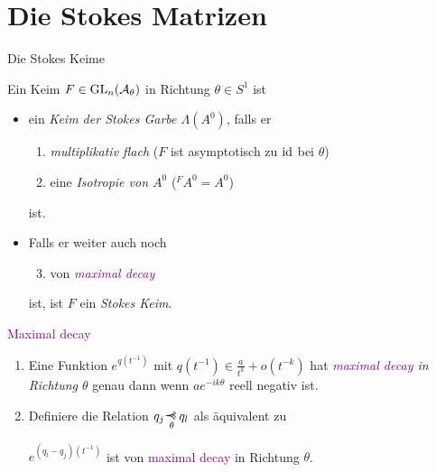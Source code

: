 \section{Die Stokes Matrizen}
\begin{frame}{Die Stokes Keime}
  \begin{defn}
    Ein Keim $F\in\operatorname{GL}_n(\mathcal{A}_\theta)$ in Richtung $\theta\in S^1$ ist
    \begin{itemize}
    \item ein \emph{Keim der Stokes Garbe \boldmath$\Lambda(A^0)$}, falls er
      \begin{enumerate}
      \item<1-> \emph{multiplikativ flach} ($F$ ist asymptotisch zu $\operatorname{id}$ bei
        $\theta$) 
      \item<2-> eine \emph{Isotropie von \boldmath$A^0$} (${}^FA^0=A^0$)
      \end{enumerate}
      ist.
    \item<3-> Falls er weiter auch noch
      \begin{enumerate}
        \setcounter{enumi}{2}
      \item von \emph{\textcolor{purple}{maximal decay}} 
      \end{enumerate}
      ist, ist $F$ ein \emph{Stokes Keim}.
    \end{itemize}
  \end{defn}
\end{frame}
\begin{frame}{\textcolor{purple}{Maximal decay}}
  \begin{defn}
    \begin{enumerate}
    \item<1-> Eine Funktion $e^{q(t^{-1})}$ mit
      $q(t^{-1})\in\frac{a}{t^{k}}+o(t^{-k})$ hat
      \emph{\textcolor{purple}{maximal decay} in Richtung \boldmath$\theta$}
      genau dann wenn $ae^{-ik\theta}$ reell negativ ist.
    \item<2-> Definiere die Relation $q_j\myrel{\theta}q_l$ als äquivalent zu
      \begin{einr}
        $e^{(q_l-q_j)(t^{-1})}$ ist von \textcolor{purple}{maximal decay} in
        Richtung $\theta$.
      \end{einr}
    \end{enumerate}
  \end{defn}
\end{frame}

